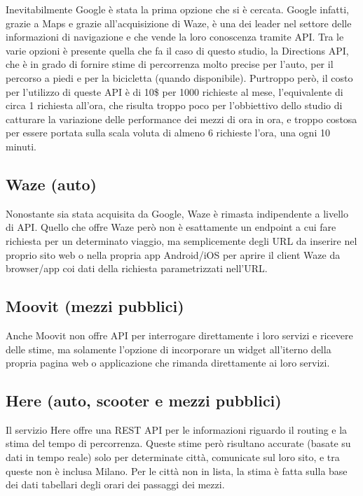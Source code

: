 Inevitabilmente Google è stata la prima opzione che si è cercata. Google infatti, grazie a Maps e grazie all'acquisizione di Waze\cite{googleblog}, è una dei leader nel settore delle informazioni di navigazione e che vende la loro conoscenza tramite API. Tra le varie opzioni è presente quella che fa il caso di questo studio, la Directions API, che è in grado di fornire stime di percorrenza molto precise per l'auto, per il percorso a piedi e per la bicicletta (quando disponibile)\cite{googleapi}. Purtroppo però, il costo per l'utilizzo di queste API è di 10\$ per 1000 richieste al mese, l'equivalente di circa 1 richiesta all'ora, che risulta troppo poco per l'obbiettivo dello studio di catturare la variazione delle performance dei mezzi di ora in ora\cite{googleapiprice}, e troppo costosa per essere portata sulla scala voluta di almeno 6 richieste l'ora, una ogni 10 minuti.

\subsection{Waze (auto)}

Nonostante sia stata acquisita da Google, Waze è rimasta indipendente a livello di API. Quello che offre Waze però non è esattamente un endpoint a cui fare richiesta per un determinato viaggio, ma semplicemente degli URL da inserire nel proprio sito web o nella propria app Android/iOS per aprire il client Waze da browser/app coi dati della richiesta parametrizzati nell'URL\cite{wazeapi}.

\subsection{Moovit (mezzi pubblici)}

Anche Moovit non offre API per interrogare direttamente i loro servizi e ricevere delle stime, ma solamente l'opzione di incorporare un widget all'iterno della propria pagina web o applicazione che rimanda direttamente ai loro servizi\cite{moovitapi}.

\subsection{Here (auto, scooter e mezzi pubblici)}

Il servizio Here offre una REST API per le informazioni riguardo il routing e la stima del tempo di percorrenza. Queste stime però risultano accurate (basate su dati in tempo reale) solo per determinate città, comunicate sul loro sito, e tra queste non è inclusa Milano. Per le città non in lista, la stima è fatta sulla base dei dati tabellari degli orari dei passaggi dei mezzi\cite{hereapi}.

